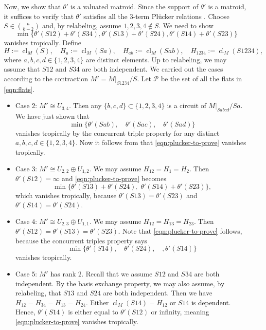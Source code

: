 \documentclass{article}
\theoremstyle{definition}
\newcommand{\cl}{\operatorname{cl}}
\newcommand{\nk}[2]{\binom{#1}{#2}}
\newcommand{\cP}{\mathcal{P}}
\begin{document}
        Now, we show that $\theta'$ is a valuated matroid. Since the support of $\theta'$ is a matroid, it suffices to verify that $\theta'$ satisfies all the 3-term Plücker relations \cite[Theorem 5.2.25]{murota2010matrices}. Choose $S\in \nk{n}{k-2}$ and, by relabeling, assume $1,2,3,4\notin S$. We need to show
    \begin{equation}\label{eqn:plucker-to-prove}
        \min\{\theta'(S12)+\theta'(S34),\theta'(S13)+\theta'(S24),\theta'(S14)+\theta'(S23)\}
    \end{equation}
    vanishes tropically. Define
     \begin{equation}\label{eqn:flats}
         H:=\cl_M(S),\quad H_a:=\cl_M(Sa),\quad H_{ab}:=\cl_M(Sab),\quad H_{1234}:=\cl_M(S1234),
     \end{equation}
     where $a,b,c,d\in \{1,2,3,4\}$ are distinct elements. Up to relabeling, we may assume that $S12$ and $S34$ are both independent. We carried out the cases according to the contraction $M'=M|_{S1234}/S$. Let $\cP$ be the set of all the flats in \eqref{eqn:flats}. 
    \begin{itemize}
        

        \item Case 2: $M'\cong U_{3,4}$. Then any $\{b,c,d\}\subset \{1,2,3,4\}$ is a circuit of $M|_{Sabcd}/Sa$. We have just shown that 
        \[\min\{\theta'(Sab),\quad \theta'(Sac),\quad  \theta'(Sad)\}\]
        vanishes tropically by the concurrent triple property for any distinct $a,b,c,d\in \{1,2,3,4\}$. Now it follows from \cite[Theorem 3.10]{joswig2023generalized} that \eqref{eqn:plucker-to-prove} vanishes tropically.

        \item Case 3: $M'\cong U_{2,2}\oplus U_{1,2}$. We may assume $H_{12}=H_1=H_2$. Then $\theta'(S12)=\infty$ and \eqref{eqn:plucker-to-prove} becomes 
        \[\min\{\theta'(S13)+\theta'(S24),\;\theta'(S14)+\theta'(S23)\},\]
        which vanishes tropically, because $\theta'(S13)=\theta'(S23)$ and $\theta'(S14)=\theta'(S24)$.

        \item Case 4: $M'\cong U_{2,3}\oplus U_{1,1}$. We may assume $H_{12}=H_{13}=H_{23}$. Then $\theta'(S12)=\theta'(S13)=\theta'(S23)$. Note that  \eqref{eqn:plucker-to-prove} follows, because the concurrent triples property says
        \[\min\{\theta'(S14),\quad \theta'(S24),\quad, \theta'(S14)\}\]
        vanishes tropically.
        
        \item Case 5: $M'$ has rank 2. Recall that we assume $S12$ and $S34$ are both independent. By the basis exchange property, we may also assume, by relabeling, that $S13$ and $S24$ are both independent. Then we have  $H_{12}=H_{34}=H_{13}=H_{24}$. Either $\cl_M(S14)=H_{12}$ or $S14$ is dependent. Hence, $\theta'(S14)$ is either equal to $\theta'(S12)$ or infinity, meaning \eqref{eqn:plucker-to-prove} vanishes tropically.
    \end{itemize}
\end{document}
